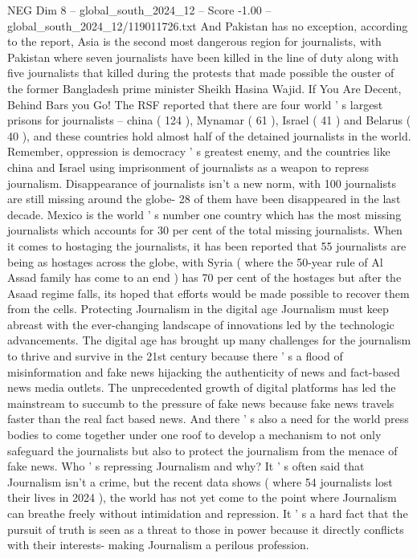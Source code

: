 \begin{textsample}{NEG Dim 8 – global\_south\_2024\_12 – Score -1.00 – global\_south\_2024\_12/119011726.txt}
And Pakistan has no exception, according to the report, Asia is the second most dangerous region for journalists, with Pakistan where seven journalists have been killed in the line of duty along with five journalists that killed during the protests that made possible the ouster of the former Bangladesh prime minister Sheikh Hasina Wajid.
If You Are Decent, Behind Bars you Go!
The RSF reported that there are four world ' s largest prisons for journalists -- china ( 124 ), Mynamar ( 61 ), Israel ( 41 ) and Belarus ( 40 ), and these countries hold almost half of the detained journalists in the world.
Remember, oppression is democracy ' s greatest enemy, and the countries like china and Israel using imprisonment of journalists as a weapon to repress journalism.
Disappearance of journalists isn't a new norm, with 100 journalists are still missing around the globe- 28 of them have been disappeared in the last decade.
Mexico is the world ' s number one country which has the most missing journalists which accounts for 30 per cent of the total missing journalists.
When it comes to hostaging the journalists, it has been reported that 55 journalists are being as hostages across the globe, with Syria ( where the 50-year rule of Al Assad family has come to an end ) has 70 per cent of the hostages but after the Asaad regime falls, its hoped that efforts would be made possible to recover them from the cells.
Protecting Journalism in the digital age Journalism must keep abreast with the ever-changing landscape of innovations led by the technologic advancements.
The digital age has brought up many challenges for the journalism to thrive and survive in the 21st century because there ' s a flood of misinformation and fake news hijacking the authenticity of news and fact-based news media outlets.
The unprecedented growth of digital platforms has led the mainstream to succumb to the pressure of fake news because fake news travels faster than the real fact based news.
And there ' s also a need for the world press bodies to come together under one roof to develop a mechanism to not only safeguard the journalists but also to protect the journalism from the menace of fake news.
Who ' s repressing Journalism and why?
It ' s often said that Journalism isn't a crime, but the recent data shows ( where 54 journalists lost their lives in 2024 ), the world has not yet come to the point where Journalism can breathe freely without intimidation and repression.
It ' s a hard fact that the pursuit of truth is seen as a threat to those in power because it directly conflicts with their interests- making Journalism a perilous profession.

\end{textsample}
